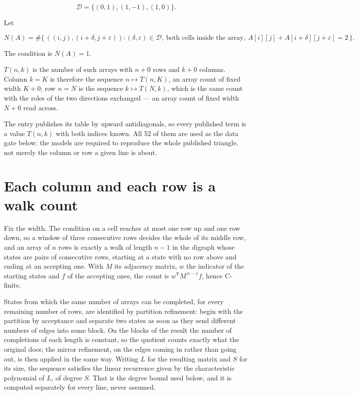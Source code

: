 \documentclass[11pt]{article}
\theoremstyle{definition}
\begin{document}
\[\mathcal{D} = \{(0,1), (1,-1), (1,0)\}.\]

Let

\[N(A) = \#\bigl\{\,((i,j),(i{+}\delta,j{+}\varepsilon)) : (\delta,\varepsilon) \in \mathcal{D},\ \text{both cells inside the array},\ A[i][j] + A[i{+}\delta][j{+}\varepsilon] = 2\,\bigr\}.\]

The condition is $N(A) = 1$.

$T(n,k)$ is the number of such arrays with $n + 0$ rows and $k + 0$ columns. Column $k = K$ is therefore the sequence $n \mapsto T(n,K)$, an array count of fixed width $K + 0$; row $n = N$ is the sequence $k \mapsto T(N,k)$, which is the same count with the roles of the two directions exchanged --- an array count of fixed width $N + 0$ read across.

The entry publishes its table by upward antidiagonals, so every published term is a value $T(n,k)$ with both indices known. All 52 of them are used as the data gate below: the models are required to reproduce the whole published triangle, not merely the column or row a given line is about.

\section{Each column and each row is a walk count}

Fix the width. The condition on a cell reaches at most one row up and one row down, so a window of three consecutive rows decides the whole of its middle row, and an array of $n$ rows is exactly a walk of length $n-1$ in the digraph whose states are pairs of consecutive rows, starting at a state with no row above and ending at an accepting one. With $M$ its adjacency matrix, $w$ the indicator of the starting states and $f$ of the accepting ones, the count is $w^{\mathsf T}M^{\,n-1}f$, hence C-finite.

States from which the same number of arrays can be completed, for every remaining number of rows, are identified by partition refinement: begin with the partition by acceptance and separate two states as soon as they send different numbers of edges into some block. On the blocks of the result the number of completions of each length is constant, so the quotient counts exactly what the original does; the mirror refinement, on the edges coming in rather than going out, is then applied in the same way. Writing $L$ for the resulting matrix and $S$ for its size, the sequence satisfies the linear recurrence given by the characteristic polynomial of $L$, of degree $S$. That is the degree bound used below, and it is computed separately for every line, never assumed.
\end{document}
